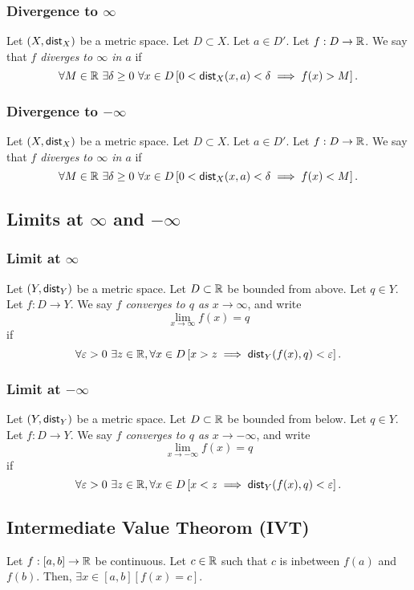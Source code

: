 \subsubsection*{Divergence to $\infty$}
\udef Let $(X, \mathsf{dist}_X)$ be a metric space. Let $D \subset X$. Let $a \in D'$.
Let $f : D \to \mathbb{R}$. We say that \emph{$f$ diverges to $\infty$ in $a$} if
\[
    \forall M \in \R\ \exists \delta \geq 0\ \forall x \in D
        \left[ 0 < \dist_X(x,a) < \delta \implies f(x) > M \right].
\]

\subsubsection*{Divergence to $-\infty$}
\udef Let $(X, \mathsf{dist}_X)$ be a metric space. Let $D \subset X$. Let $a \in D'$.
Let $f : D \to \mathbb{R}$. We say that \emph{$f$ diverges to $\infty$ in $a$} if
\[
    \forall M \in \R\ \exists \delta \geq 0\ \forall x \in D
        \left[ 0 < \dist_X(x,a) < \delta \implies f(x) < M \right].
\]

\subsection{Limits at $\infty$ and $-\infty$}
\subsubsection*{Limit at $\infty$}
\udef Let $(Y, \mathsf{dist}_Y)$ be a metric space. Let $D \subset \mathbb{R}$ be bounded from above.
Let $q \in Y$. Let $f : D \to Y$. We say \emph{$f$ converges to $q$ as $x \to \infty$},
and write
\[
    \lim_{x \to \infty} f(x) = q
\]
if
\[
    \forall \varepsilon > 0\ \exists z \in \mathbb{R}, \forall x \in D
        \left[ x > z \implies \mathsf{dist}_Y(f(x),q) < \varepsilon \right].
\]

\subsubsection*{Limit at $-\infty$}
\udef Let $(Y, \mathsf{dist}_Y)$ be a metric space. Let $D \subset \mathbb{R}$ be bounded from below.
Let $q \in Y$. Let $f : D \to Y$. We say \emph{$f$ converges to $q$ as $x \to -\infty$},
and write
\[
    \lim_{x \to -\infty} f(x) = q
\]
if
\[
    \forall \varepsilon > 0\ \exists z \in \mathbb{R}, \forall x \in D
        \left[ x < z \implies \mathsf{dist}_Y(f(x),q) < \varepsilon \right].
\]


\subsection{Intermediate Value Theorom (IVT)}
\uthm Let $f : [a,b] \to \mathbb{R}$ be continuous. Let $c \in \mathbb{R}$ such that $c$
is inbetween $f(a)$ and $f(b)$. Then,
$\exists x \in [a,b] \left[ f(x) = c \right]$.


